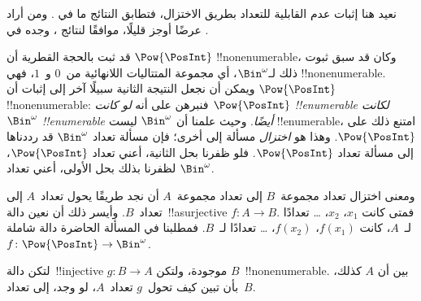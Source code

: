 \documentclass[../../../include/open-logic-section]{subfiles}
\begin{document}


\begin{editorial}
نعيد هنا إثبات عدم القابلية للتعداد بطريق الاختزال، فتطابق النتائج ما في . ومن أراد عرضًا أوجز قليلًا، موافقًا لنتائج ، وجده في .
\end{editorial}

قد ثبت بالحجة القطرية أن $\Pow{\PosInt}$ !!{nonenumerable}، وكان قد سبق ثبوت ذلك لـ$\Bin^\omega$، أي مجموعة المتتاليات اللانهائية من~$0$ و~$1$، فهي !!{nonenumerable}. ويمكن أن نجعل النتيجة الثانية سبيلًا آخر إلى إثبات أن $\Pow{\PosInt}$ !!{nonenumerable}: فنبرهن على أنه \emph{لو كانت $\Pow{\PosInt}$ !!{enumerable} لكانت $\Bin^\omega$ !!{enumerable} أيضًا}. وحيث علمنا أن $\Bin^\omega$ ليست !!{enumerable}، امتنع ذلك على $\Pow{\PosInt}$. وهذا هو \emph{اختزال} مسألة إلى أخرى؛ فإن مسألة تعداد $\Bin^\omega$ قد رددناها إلى مسألة تعداد $\Pow{\PosInt}$. فلو ظفرنا بحل الثانية، أعني تعداد $\Pow{\PosInt}$، لظفرنا بذلك بحل الأولى، أعني تعداد $\Bin^\omega$.

ومعنى اختزال تعداد مجموعة~$B$ إلى تعداد مجموعة~$A$ أن نجد طريقًا يحول تعداد~$A$ إلى تعداد~$B$. وأيسر ذلك أن نعين دالة~!!a{surjective} $f\colon A \to B$. فمتى كانت $x_1$، $x_2$، \dots{} تعدادًا لـ~$A$، كانت $f(x_1)$، $f(x_2)$، \dots{} تعدادًا لـ~$B$. فمطلبنا في المسألة الحاضرة دالة شاملة $f\colon \Pow{\PosInt} \to \Bin^\omega$.

\begin{prob}
لتكن دالة~!!{injective} $g\colon B \to A$ موجودة، ولتكن $B$~!!{nonenumerable}. بين أن $A$ كذلك، بأن تبين كيف تحول~$g$ تعداد~$A$، لو وجد، إلى تعداد~$B$.
\end{prob}
\end{document}
